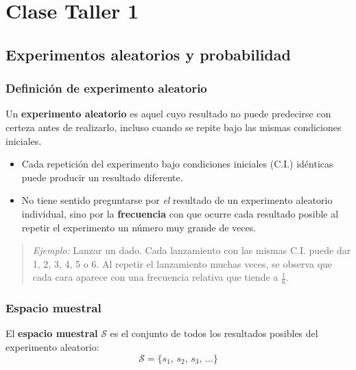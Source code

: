 \shorthandoff{<>}


\shorthandon{<>}

\chapter{Clase Taller 1}

\section{Experimentos aleatorios y probabilidad}

\subsection{Definición de experimento aleatorio}

Un \textbf{experimento aleatorio} es aquel cuyo resultado no puede predecirse con certeza antes de realizarlo, incluso cuando se repite bajo las mismas condiciones iniciales.

\begin{itemize}
    \item Cada repetición del experimento bajo condiciones iniciales (C.I.) idénticas puede producir un resultado diferente.
    \item No tiene sentido preguntarse por \emph{el} resultado de un experimento aleatorio individual, sino por la \textbf{frecuencia} con que ocurre cada resultado posible al repetir el experimento un número muy grande de veces.
\end{itemize}

\begin{quote}
\textit{Ejemplo:} Lanzar un dado. Cada lanzamiento con las mismas C.I. puede dar 1, 2, 3, 4, 5 o 6. Al repetir el lanzamiento muchas veces, se observa que cada cara aparece con una frecuencia relativa que tiende a $\frac{1}{6}$.
\end{quote}

\subsection{Espacio muestral}

El \textbf{espacio muestral} $\mathcal{S}$ es el conjunto de todos los resultados posibles del experimento aleatorio:
$$
\mathcal{S} = \{s_1,\, s_2,\, s_3,\, \ldots\}
$$

